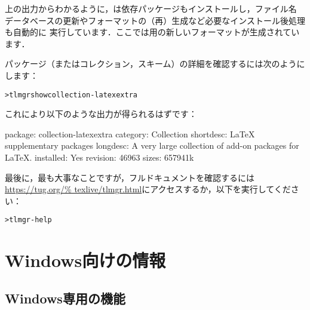 \documentclass[uplatex,dvipdfmx,tombow]{jsarticle}
\begin{document}
上の出力からわかるように，は依存パッケージもインストールし，ファイル名
データベースの更新やフォーマットの（再）生成など必要なインストール後処理も自動的に
実行しています．ここでは\XeTeX 用の新しいフォーマットが生成されています．

パッケージ（またはコレクション，スキーム）の詳細を確認するには次のようにします：
%
\begin{alltt}
> tlmgr show collection-latexextra
\end{alltt}
%
これにより以下のような出力が得られるはずです：
%
\begin{fverbatim}
package:    collection-latexextra
category:   Collection
shortdesc:  LaTeX supplementary packages
longdesc:   A very large collection of add-on packages for LaTeX.
installed:  Yes
revision:   46963
sizes:      657941k
\end{fverbatim}
%
最後に，最も大事なことですが，フルドキュメントを確認するには\url{https://tug.org/%
texlive/tlmgr.html}にアクセスするか，以下を実行してください：
%
\begin{alltt}
> tlmgr -help
\end{alltt}

\section{Windows向けの情報}
\label{sec:windows}

\subsection{Windows専用の機能}
\label{sec:winfeatures}
\end{document}
